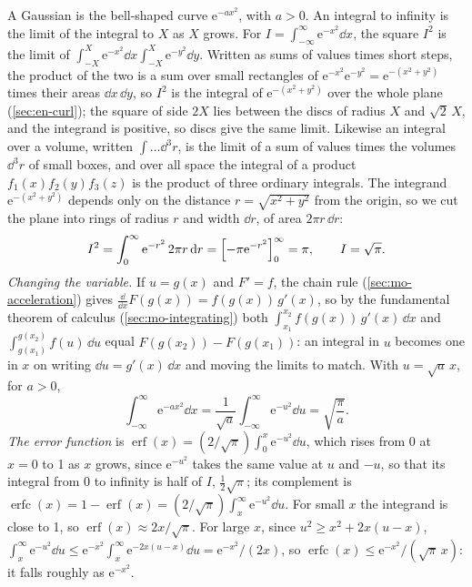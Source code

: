 \begin{toolbox}
A Gaussian is the bell-shaped curve $\mathrm{e}^{-ax^2}$, with $a > 0$.
An integral to infinity is the limit of the integral to $X$ as $X$ grows.
For $I = \int_{-\infty}^{\infty}\mathrm{e}^{-x^2}\dd x$, the square $I^2$
is the limit of $\int_{-X}^{X}\mathrm{e}^{-x^2}\dd x\int_{-X}^{X}
\mathrm{e}^{-y^2}\dd y$. Written as sums of values times short steps, the
product of the two is a sum over small rectangles of $\mathrm{e}^{-x^2}
\mathrm{e}^{-y^2} = \mathrm{e}^{-(x^2 + y^2)}$ times their areas $\dd x\,
\dd y$, so $I^2$ is the integral of $\mathrm{e}^{-(x^2 + y^2)}$ over the
whole plane (\cref{sec:en-curl}); the square of side $2X$ lies between the
discs of radius $X$ and $\sqrt2\,X$, and the integrand is positive, so
discs give the same limit. Likewise an integral over a volume, written
$\int\dots\dd^3r$, is the limit of a sum of values times the volumes
$\dd^3r$ of small boxes, and over all space the integral of a product
$f_1(x)f_2(y)f_3(z)$ is the product of three ordinary integrals. The
integrand $\mathrm{e}^{-(x^2 + y^2)}$ depends only on the distance $r =
\sqrt{x^2 + y^2}$ from the origin, so we cut the plane into rings of
radius $r$ and width $\dd r$, of area $2\pi r\,\dd r$:
\begin{equation*}
   I^2 = \int_0^{\infty}\mathrm{e}^{-r^2}\,2\pi r\,\mathrm{d} r
   = \Bigl[-\pi\mathrm{e}^{-r^2}\Bigr]_0^{\infty} = \pi ,
   \qquad I = \sqrt\pi .
\end{equation*}
\emph{Changing the variable.} If $u = g(x)$ and $F' = f$, the chain rule
(\cref{sec:mo-acceleration}) gives $\frac{\dd}{\dd x}F(g(x)) =
f(g(x))\,g'(x)$, so by the fundamental theorem of calculus
(\cref{sec:mo-integrating}) both $\int_{x_1}^{x_2}f(g(x))\,g'(x)\,\dd x$
and $\int_{g(x_1)}^{g(x_2)}f(u)\,\dd u$ equal $F(g(x_2)) - F(g(x_1))$: an
integral in $u$ becomes one in $x$ on writing $\dd u = g'(x)\,\dd x$ and
moving the limits to match. With $u = \sqrt a\,x$, for $a > 0$,
\begin{equation*}
   \int_{-\infty}^{\infty}\mathrm{e}^{-ax^2}\dd x
   = \frac1{\sqrt a}\int_{-\infty}^{\infty}\mathrm{e}^{-u^2}\dd u
   = \sqrt{\frac{\pi}{a}} .
\end{equation*}
\emph{The error function} is $\operatorname{erf}(x) = (2/\sqrt\pi)
\int_0^x\mathrm{e}^{-u^2}\dd u$, which rises from 0 at $x = 0$ to 1 as $x$
grows, since $\mathrm{e}^{-u^2}$ takes the same value at $u$ and $-u$, so
that its integral from 0 to infinity is half of $I$, $\frac12\sqrt\pi$;
its complement is $\operatorname{erfc}(x) = 1 - \operatorname{erf}(x) =
(2/\sqrt\pi)\int_x^{\infty}\mathrm{e}^{-u^2}\dd u$. For small $x$ the
integrand is close to 1, so $\operatorname{erf}(x) \approx 2x/\sqrt\pi$.
For large $x$, since $u^2 \ge x^2 + 2x(u - x)$, $\int_x^{\infty}
\mathrm{e}^{-u^2}\dd u \le \mathrm{e}^{-x^2}\int_x^{\infty}\mathrm{e}^{-2x(u
- x)}\dd u = \mathrm{e}^{-x^2}/(2x)$, so $\operatorname{erfc}(x) \le
\mathrm{e}^{-x^2}/(\sqrt\pi\,x)$: it falls roughly as $\mathrm{e}^{-x^2}$.
\end{toolbox}

